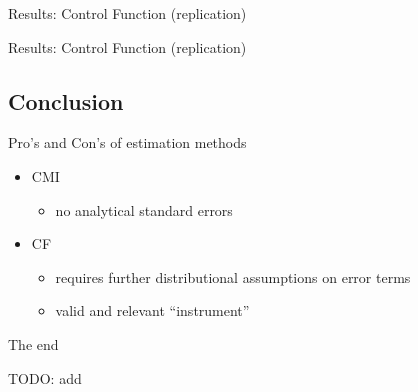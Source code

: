 \documentclass[10pt,ignorenonframetext,]{beamer}
\providecommand{\tightlist}{%
  \setlength{\itemsep}{0pt}\setlength{\parskip}{0pt}}
\begin{document}
\begin{frame}{Results: Control Function (replication)}
\end{frame}

\begin{frame}{Results: Control Function (replication)}
\protect\hypertarget{results-control-function-replication-1}{}

\end{frame}

\hypertarget{conclusion}{%
\subsection{Conclusion}\label{conclusion}}

\begin{frame}{Pro's and Con's of estimation methods}
\protect\hypertarget{pros-and-cons-of-estimation-methods}{}

\begin{itemize}
\tightlist
\item
  CMI

  \begin{itemize}
  \tightlist
  \item
    no analytical standard errors
  \end{itemize}
\item
  CF

  \begin{itemize}
  \tightlist
  \item
    requires further distributional assumptions on error terms
  \item
    valid and relevant ``instrument''
  \end{itemize}
\end{itemize}

\end{frame}

\begin{frame}[allowframebreaks]{The end}
\protect\hypertarget{the-end}{}

TODO: add

\end{frame}
\end{document}

